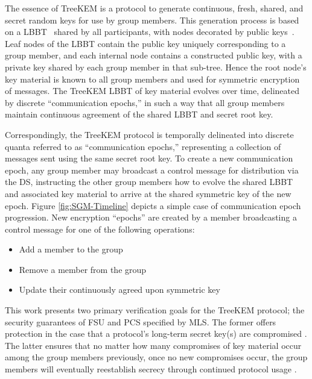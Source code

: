 \documentclass[runningheads]{llncs}
\newcommand{\Abrev}[1]{\gls{#1}}
\begin{document}
The essence of TreeKEM is a protocol to generate continuous, fresh, shared, and secret random keys for use by group members.
This generation process is based on a \Abrev{LBBT}~\cite{baerentzen2003left} shared by all participants, with nodes decorated by public keys~\cite{rfc4949}.
Leaf nodes of the \Abrev{LBBT} contain the public key uniquely corresponding to a group member, and each 
internal node contains a constructed public key, with a private key shared by each group member in that sub-tree.
Hence the root node's key material is known to all group members and used for symmetric encryption of messages.
The TreeKEM \Abrev{LBBT} of key material evolves over time, delineated by discrete ``communication epochs,'' in such a way that all group members maintain continuous agreement of the shared \Abrev{LBBT} and secret root key.

Correspondingly, the TreeKEM protocol is temporally delineated into discrete quanta referred to as ``communication epochs,'' representing a collection of messages sent using the same secret root key.
To create a new communication epoch, any group member may broadcast a control message for distribution via the \Abrev{DS}, instructing the other group members how to evolve the shared \Abrev{LBBT} and associated key material to arrive at the shared symmetric key of the new epoch.
Figure \ref{fig:SGM-Timeline} depicts a simple case of communication epoch progression.
New encryption ``epochs'' are created by a member broadcasting a control message for one of the following operations:

\begin{itemize}
	\item Add a member to the group
	\item Remove a member from the group
	\item Update their continuously agreed upon symmetric key
\end{itemize}

This work presents two primary verification goals for the TreeKEM protocol; the security guarantees of \Abrev{FSU} and  \Abrev{PCS} specified by \Abrev{MLS}.
The former offers protection in the case that a protocol's long-term secret key(s) are compromised \cite{boyd2021modern}.
The latter ensures that no matter how many compromises of key material occur among the group members previously, once no new compromises occur, the group members will eventually reestablish secrecy through continued protocol usage \cite{CohnGordon2016}.\\[-1mm]
\end{document}
